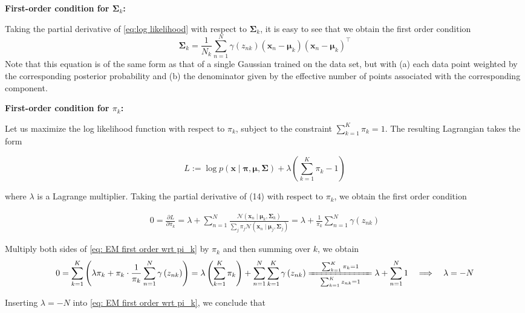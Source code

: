 \documentclass[11pt]{article}
\theoremstyle{plain} %
\newenvironment{topic}
{\color{C2}\normalfont\begin{framed}\begingroup }
  {\endgroup\end{framed}}
\theoremstyle{remark}
\begin{document}
\begin{topic}
\textbf{First-order condition for $\boldsymbol{\Sigma}_{k}$:}

Taking the partial derivative of \cref{eq:log likelihood} with respect to $\boldsymbol{\Sigma}_{k}$,
it is easy to see that we obtain the first order condition
$$
  \boldsymbol{\Sigma}_{k}=\frac{1}{N_{k}} \sum_{n=1}^{N} \gamma\left(z_{n k}\right)\left(\mathbf{x}_{n}-\boldsymbol{\mu}_{k}\right)\left(\mathbf{x}_{n}-\boldsymbol{\mu}_{k}\right)^\top
$$
Note that this equation is of the same form as that of a single Gaussian trained on the
data set, but with (a) each data point weighted by the corresponding posterior
probability and (b) the denominator given by the effective number of points
associated with the corresponding component.

\textbf{First-order condition for $\pi_{k}$:}

Let us maximize the log likelihood function with respect to $\pi_{k}$, subject to the constraint $\sum_{k=1}^K \pi_{k} = 1$.
The resulting Lagrangian takes the form

$$
  L:=\log p(\mathbf{x} \mid \boldsymbol{\pi}, \boldsymbol{\mu}, \boldsymbol{\Sigma})+\lambda\left(\sum_{k=1}^{K} \pi_{k}-1\right)
$$

where $\lambda$ is a Lagrange multiplier. Taking the partial derivative of (14)
with respect to $\pi_{k}$, we obtain the first order condition

\begin{align}
  0 = \frac{\partial L}{\partial \pi_k}
  =\lambda+\sum_{n=1}^{N} \frac{\mathcal{N}\left(\mathbf{x}_{n} \mid \boldsymbol{\mu}_{k}, \boldsymbol{\Sigma}_{k}\right)}{\sum_{j} \pi_{j} \mathcal{N}\left(\mathbf{x}_{n} \mid \boldsymbol{\mu}_{j}, \boldsymbol{\Sigma}_{j}\right)}
  =\lambda +  \frac{1}{\pi_k}\sum_{n=1}^{N}\gamma\left(z_{n k}\right)
  \label{eq: EM first order wrt pi_k}
\end{align}


Multiply both sides of \cref{eq: EM first order wrt pi_k} by $\pi_{k}$ and then summing over $k$, we obtain
$$
  0 =\sum_{k=1}^K \left(\lambda\pi_k + \pi_k \cdot \frac{1}{\pi_k}\sum_{n=1}^{N} \gamma\left(z_{n k}\right)\right)
  = \lambda\left(\sum_{k=1}^K \pi_k\right) + \sum_{n=1}^{N} \sum_{k=1}^K \gamma\left(z_{n k}\right)
  \xlongequal[\quad \sum_{k=1}^K z_{n k} = 1\quad ]{\quad \sum_{k=1}^K \pi_{k} = 1\quad }
  \lambda + \sum_{n=1}^{N} 1
  \quad \Longrightarrow\quad
  \lambda = -N
$$

Inserting $\lambda = -N$ into \cref{eq: EM first order wrt pi_k},  we conclude that


\end{topic}
\end{document}
